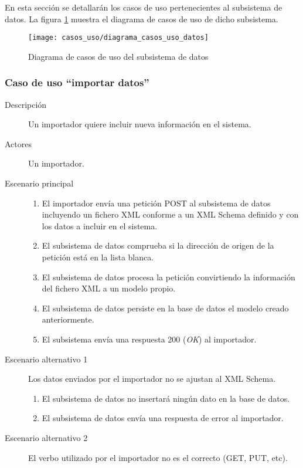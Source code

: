 En esta sección se detallarán los casos de uso pertenecientes al subsistema de datos. La figura \ref{fig:casos_uso_subsistema_datos} muestra el diagrama de casos de uso de dicho subsistema.

\begin{figure}[h]
\centering
\texttt{[image: casos\_uso/diagrama\_casos\_uso\_datos]}
\caption{Diagrama de casos de uso del subsistema de datos}
\label{fig:casos_uso_subsistema_datos}
\end{figure}

\subsubsection{Caso de uso ``importar datos''}
\begin{description}
\item[Descripción] Un importador quiere incluir nueva información en el sistema.
\item[Actores] Un importador.
\item[Escenario principal] \hfill
							\begin{enumerate}
							\item El importador envía una petición POST al subsistema de datos incluyendo un fichero XML conforme a un XML Schema definido y con los datos a incluir en el sistema.
							\item El subsistema de datos comprueba si la dirección de origen de la petición está en la lista blanca.
							\item El subsistema de datos procesa la petición convirtiendo la información del fichero XML a un modelo propio.
							\item El subsistema de datos persiste en la base de datos el modelo creado anteriormente.
							\item El subsistema envía una respuesta 200 (\textit{OK}) al importador.
							\end{enumerate}
\item[Escenario alternativo 1] Los datos enviados por el importador no se ajustan al XML Schema.
							\begin{enumerate}
							\item El subsistema de datos no insertará ningún dato en la base de datos.
							\item El subsistema de datos envía una respuesta de error al importador.
							\end{enumerate}
\item[Escenario alternativo 2] El verbo utilizado por el importador no es el correcto (GET, PUT, etc).

\end{description}

